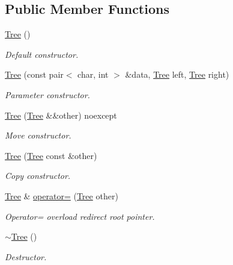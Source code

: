 \subsection*{Public Member Functions}
\begin{DoxyCompactItemize}
\item 
\mbox{\label{class_tree_ad376a7c639d857312f5de2ef47482f68}} 
\mbox{\hyperlink{class_tree_ad376a7c639d857312f5de2ef47482f68}{Tree}} ()
\begin{DoxyCompactList}\small\item\em Default constructor. \end{DoxyCompactList}\item 
\mbox{\hyperlink{class_tree_a29cca0965aba0338ff53f2cfc20c5e76}{Tree}} (const pair$<$ char, int $>$ \&data, \mbox{\hyperlink{class_tree}{Tree}} left, \mbox{\hyperlink{class_tree}{Tree}} right)
\begin{DoxyCompactList}\small\item\em Parameter constructor. \end{DoxyCompactList}\item 
\mbox{\hyperlink{class_tree_aa038ecb4a7ccb6de5c55962ca2e2f2f6}{Tree}} (\mbox{\hyperlink{class_tree}{Tree}} \&\&other) noexcept
\begin{DoxyCompactList}\small\item\em Move constructor. \end{DoxyCompactList}\item 
\mbox{\hyperlink{class_tree_a8c22d028f94cbad27f3b96a336b2449c}{Tree}} (\mbox{\hyperlink{class_tree}{Tree}} const \&other)
\begin{DoxyCompactList}\small\item\em Copy constructor. \end{DoxyCompactList}\item 
\mbox{\hyperlink{class_tree}{Tree}} \& \mbox{\hyperlink{class_tree_aaeb1ef0af85ad2c40d332b156583653f}{operator=}} (\mbox{\hyperlink{class_tree}{Tree}} other)
\begin{DoxyCompactList}\small\item\em Operator= overload redirect root pointer. \end{DoxyCompactList}\item 
\mbox{\label{class_tree_abdc38545cf3f588725b5d8b8075b3866}} 
\mbox{\hyperlink{class_tree_abdc38545cf3f588725b5d8b8075b3866}{$\sim$\+Tree}} ()
\begin{DoxyCompactList}\small\item\em Destructor. \end{DoxyCompactList}\item 

\end{DoxyCompactItemize}
